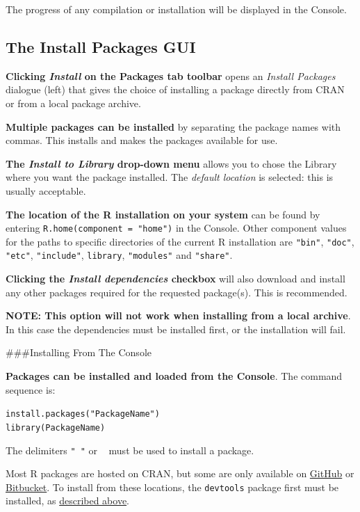 \documentclass[]{book}
\theoremstyle{definition}
\theoremstyle{definition}
\theoremstyle{definition}
\theoremstyle{remark}
\begin{document}
The progress of any compilation or installation will be displayed in the
Console.

\hypertarget{the-install-packages-gui}{%
\subsection{The Install Packages GUI}\label{the-install-packages-gui}}

\textbf{Clicking \emph{Install} on the Packages tab toolbar} opens an
\emph{Install Packages} dialogue (left) that gives the choice of
installing a package directly from CRAN or from a local package archive.

\textbf{Multiple packages can be installed} by separating the package
names with commas. This installs and makes the packages available for
use.

\textbf{The \emph{Install to Library} drop-down menu} allows you to
chose the Library where you want the package installed. The
\emph{default location} is selected: this is usually acceptable.

\textbf{The location of the R installation on your system} can be found
by entering \texttt{R.home(component\ =\ "home")} in the Console. Other
component values for the paths to specific directories of the current R
installation are \texttt{"bin"}, \texttt{"doc"}, \texttt{"etc"},
\texttt{"include"}, \texttt{library}, \texttt{"modules"} and
\texttt{"share"}.

\textbf{Clicking the \emph{Install dependencies} checkbox} will also
download and install any other packages required for the requested
package(s). This is recommended.

\textbf{NOTE: This option will not work when installing from a local
archive}. In this case the dependencies must be installed first, or the
installation will fail.

\#\#\#Installing From The Console

\textbf{Packages can be installed and loaded from the Console}. The
command sequence is:

\texttt{install.packages("PackageName")}\\
\texttt{library(PackageName)}

The delimiters \texttt{"\ "} or
\texttt{\textquotesingle{}\ \textquotesingle{}} must be used to install
a package.

Most R packages are hosted on CRAN, but some are only available on
\href{https://github.com}{GitHub} or
\href{https://bitbucket.org}{Bitbucket}. To install from these
locations, the \texttt{devtools} package first must be installed, as
\protect\hyperlink{installing-packages-from-github}{described above}.
\end{document}
